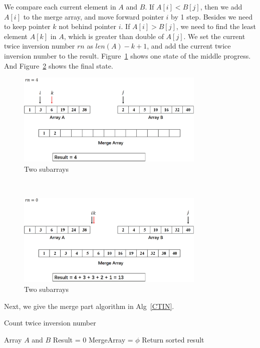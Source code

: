 We compare each current element in $A$ and $B$. If $A[i] < B[j]$, then we add $A[i]$ to the merge array, and move forward pointer $i$ by 1 step. Besides we need to keep pointer $k$ not behind pointer $i$. If $A[i] > B[j]$, we need to find the least element $A[k]$ in $A$, which is greater than double of $A[j]$. We set the current twice inversion number $rn$ as $len(A)-k+1$, and add the current twice inversion number to the result. Figure~\ref{fig3} shows one state of the middle progress. And Figure~\ref{fig4} shows the final state.
\\
\begin{figure}[!htbp]
\centering
\includegraphics[width=0.8\textwidth]{figures/3.eps}
\caption{Two subarrays}\label{fig3}
\end{figure}
\\
\begin{figure}[!htbp]
\centering
\includegraphics[width=0.8\textwidth]{figures/4.eps}
\caption{Two subarrays}\label{fig4}
\end{figure}

Next, we give the merge part algorithm in Alg~\ref{CTIN}.
\begin{algorithm}
\caption{Count twice inversion number}
\label{CTIN}
\begin{algorithmic}[1]
\REQUIRE Array $A$ and $B$
\STATE Result = 0
\STATE MergeArray = $\phi$
        \ENDIF
    \ELSE
        \ENDWHILE
    \ENDIF
\ENDWHILE
{}
\STATE Return sorted result
\end{algorithmic}
\end{algorithm}